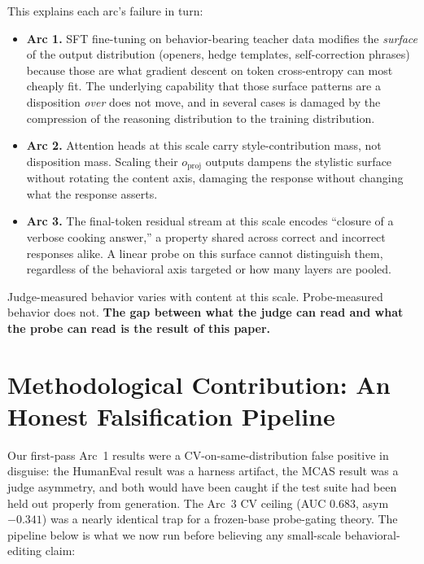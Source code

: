 \documentclass[11pt,a4paper]{article}
\begin{document}
This explains each arc's failure in turn:

\begin{itemize}[leftmargin=*]
\item \textbf{Arc 1.} SFT fine-tuning on behavior-bearing teacher data modifies the \emph{surface} of the output distribution (openers, hedge templates, self-correction phrases) because those are what gradient descent on token cross-entropy can most cheaply fit. The underlying capability that those surface patterns are a disposition \emph{over} does not move, and in several cases is damaged by the compression of the reasoning distribution to the training distribution.
\item \textbf{Arc 2.} Attention heads at this scale carry style-contribution mass, not disposition mass. Scaling their $o_{\text{proj}}$ outputs dampens the stylistic surface without rotating the content axis, damaging the response without changing what the response asserts.
\item \textbf{Arc 3.} The final-token residual stream at this scale encodes ``closure of a verbose cooking answer,'' a property shared across correct and incorrect responses alike. A linear probe on this surface cannot distinguish them, regardless of the behavioral axis targeted or how many layers are pooled.
\end{itemize}

Judge-measured behavior varies with content at this scale. Probe-measured behavior does not. \textbf{The gap between what the judge can read and what the probe can read is the result of this paper.}

\section{Methodological Contribution: An Honest Falsification Pipeline}

Our first-pass Arc~1 results were a CV-on-same-distribution false positive in disguise: the HumanEval result was a harness artifact, the MCAS result was a judge asymmetry, and both would have been caught if the test suite had been held out properly from generation. The Arc~3 CV ceiling (AUC $0.683$, asym $-0.341$) was a nearly identical trap for a frozen-base probe-gating theory. The pipeline below is what we now run before believing any small-scale behavioral-editing claim:
\end{document}
